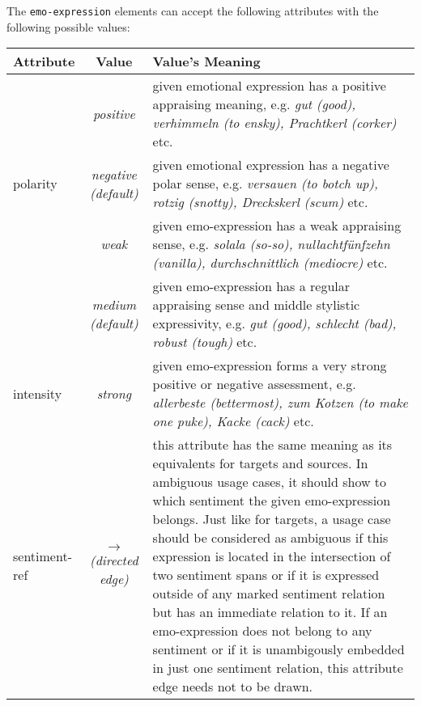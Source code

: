 \documentclass[11pt,a4paper]{article}
\newlength\clmnwidth
\begin{document}
The \texttt{emo-expression} elements can accept the following
attributes with the following possible values:
\begin{center}
  \begin{tabular}{|l|c|p{\clmnwidth}|}\hline\label{tbl-emo}
    Attribute & Value & Value's Meaning\\\hline

    & \textit{positive} & given emotional
    expression has a positive appraising meaning, e.g. \textit{gut
      (good), verhimmeln (to ensky), Prachtkerl (corker)}
    etc.\\\cline{2-3}

    \multirow{-2}{*}{polarity} & \textit{negative\newline(default)} & given
    emotional expression has a negative polar sense, e.g. \textit{versauen (to
      botch up), rotzig (snotty), Dreckskerl (scum)} etc.\\\hline


    & \textit{weak} & given emo-expression has a weak appraising sense,
    e.g. \textit{solala (so-so), nullachtf\"unfzehn (vanilla),
      durchschnittlich (mediocre)} etc.\\\cline{2-3}

    & \textit{medium\newline(default)} & given emo-expression has a regular
    appraising sense and middle stylistic expressivity, e.g. \textit{gut
      (good), schlecht (bad), robust (tough)} etc.\\\cline{2-3}

    \multirow{-3}{*}{intensity} & \textit{strong} & given emo-expression forms
    a very strong positive or negative assessment, e.g. \textit{allerbeste
      (bettermost), zum Kotzen (to make one puke), Kacke (cack)} etc.\\\hline


    sentiment-ref & \textit{$\longrightarrow$\newline(directed edge)} & this
    attribute has the same meaning as its equivalents for targets and sources.
    In ambiguous usage cases, it should show to which sentiment the given
    emo-expression belongs.  Just like for targets, a usage case should be
    considered as ambiguous if this expression is located in the intersection
    of two sentiment spans or if it is expressed outside of any marked
    sentiment relation but has an immediate relation to it.  If an
    emo-expression does not belong to any sentiment or if it is unambigously
    embedded in just one sentiment relation, this attribute edge needs not to
    be drawn.\\\hline
  \end{tabular}
\end{center}
\end{document}

